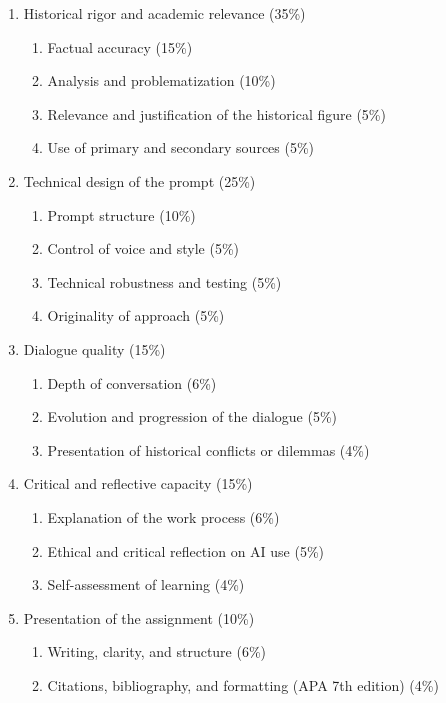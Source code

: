 \documentclass[english]{textolivre}
\begin{document}
\begin{enumerate}
    \item Historical rigor and academic relevance (35\%)
    \begin{enumerate}
        \item Factual accuracy (15\%)
        \item Analysis and problematization (10\%)
        \item Relevance and justification of the historical figure (5\%)
        \item Use of primary and secondary sources (5\%)
    \end{enumerate}
    \item Technical design of the prompt (25\%)
    \begin{enumerate}
        \item Prompt structure (10\%)
        \item Control of voice and style (5\%)
        \item Technical robustness and testing (5\%)
        \item Originality of approach (5\%)
    \end{enumerate}
    \item Dialogue quality (15\%)
    \begin{enumerate}
        \item Depth of conversation (6\%)
        \item Evolution and progression of the dialogue (5\%)
        \item Presentation of historical conflicts or dilemmas (4\%)
    \end{enumerate}
    \item Critical and reflective capacity (15\%)
    \begin{enumerate}
        \item Explanation of the work process (6\%)
        \item Ethical and critical reflection on AI use (5\%)
        \item Self-assessment of learning (4\%)
    \end{enumerate}
    \item Presentation of the assignment (10\%)
    \begin{enumerate}
        \item Writing, clarity, and structure (6\%)
        \item Citations, bibliography, and formatting (APA 7th edition) (4\%)
    \end{enumerate}
\end{enumerate}
\end{document}
